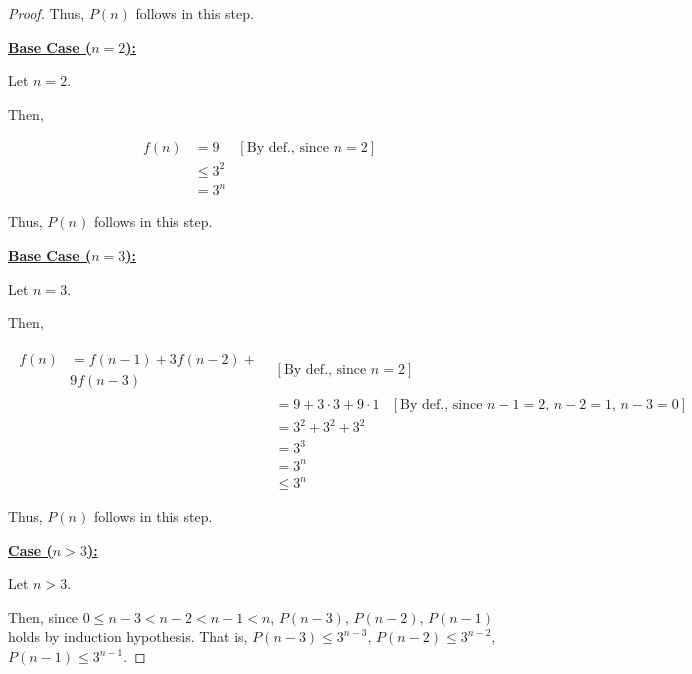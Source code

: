 \documentclass[12pt]{article}
\begin{document}
\begin{itemize}
\begin{proof}
        Thus, $P(n)$ follows in this step.

        \bigskip

        \underline{\textbf{Base Case ($n = 2$):}}

        \bigskip

        Let $n = 2$.

        \bigskip

        Then,

        \begin{align}
            f(n) &= 9 & [\text{By def., since $n = 2$}]\\
            &\leq 3^2\\
            &= 3^n
        \end{align}

        \bigskip

        Thus, $P(n)$ follows in this step.

        \bigskip

        \underline{\textbf{Base Case ($n = 3$):}}

        \bigskip

        Let $n = 3$.

        \bigskip

        Then,

        \begin{align}
            \begin{split}
            f(n) &= f(n-1) + 3f(n-2) +\\
            &9f(n-3)
            \end{split} & [\text{By def., since $n = 2$}]\\
            &= 9 + 3 \cdot 3 + 9 \cdot 1 & [\text{By def., since $n-1 = 2$, $n-2=1$, $n-3=0$}]\\
            &= 3^2 + 3^2 + 3^2\\
            &= 3^3\\
            &= 3^n\\
            &\leq 3^n
        \end{align}

        \bigskip

        Thus, $P(n)$ follows in this step.

        \underline{\textbf{Case ($n > 3$):}}

        \bigskip

        Let $n > 3$.

        \bigskip

        Then, since $0 \leq n-3 < n-2 < n-1 < n$, $P(n-3)$, $P(n-2)$, $P(n-1)$
        holds by induction hypothesis. That is, $P(n-3) \leq 3^{n-3}$, $P(n-2) \leq 3^{n-2}$,
        $P(n-1) \leq 3^{n-1}$.


\end{proof}
\end{itemize}
\end{document}
